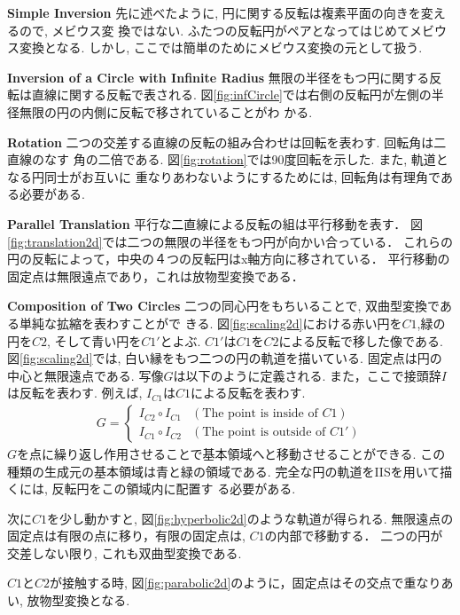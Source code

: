 \noindent\textbf{Simple Inversion}
先に述べたように, 円に関する反転は複素平面の向きを変えるので, メビウス変
換ではない.
ふたつの反転円がペアとなってはじめてメビウス変換となる.
しかし, ここでは簡単のためにメビウス変換の元として扱う.

\noindent\textbf{Inversion of a Circle with Infinite Radius}
無限の半径をもつ円に関する反転は直線に関する反転で表される.
図\ref{fig:infCircle}では右側の反転円が左側の半径無限の円の内側に反転で移されていることがわ
かる.

\noindent\textbf{Rotation}
二つの交差する直線の反転の組み合わせは回転を表わす. 回転角は二直線のなす
角の二倍である. 図\ref{fig:rotation}では90度回転を示した. また, 軌道となる円同士がお互いに
重なりあわないようにするためには, 回転角は有理角である必要がある.

\noindent\textbf{Parallel Translation}
平行な二直線による反転の組は平行移動を表す．
図\ref{fig:translation2d}では二つの無限の半径をもつ円が向かい合っている．
これらの円の反転によって，中央の４つの反転円はx軸方向に移されている．
平行移動の固定点は無限遠点であり，これは放物型変換である．

\noindent\textbf{Composition of Two Circles}
二つの同心円をもちいることで, 双曲型変換である単純な拡縮を表わすことがで
きる.
図\ref{fig:scaling2d}における赤い円を$C1$,緑の円を$C2$, そして青い円を$C1'$とよぶ.
$C1'$は$C1$を$C2$による反転で移した像である.
図\ref{fig:scaling2d}では, 白い縁をもつ二つの円の軌道を描いている.
固定点は円の中心と無限遠点である.
写像$G$は以下のように定義される.
また，ここで接頭辞$I$は反転を表わす.
例えば, $I_{C1}$は$C1$による反転を表わす.
\begin{align*}
 G =
  \begin{cases}
   I_{C2} \circ I_{C1} & (\text{The point is inside of } C1) \\
   I_{C1} \circ I_{C2} & (\text{The point is outside of } C1')
  \end{cases}
\end{align*}
$G$を点に繰り返し作用させることで基本領域へと移動させることができる.
この種類の生成元の基本領域は青と緑の領域である.
完全な円の軌道をIISを用いて描くには, 反転円をこの領域内に配置す
る必要がある.

次に$C1$を少し動かすと, 図\ref{fig:hyperbolic2d}のような軌道が得られる.
無限遠点の固定点は有限の点に移り，有限の固定点は, $C1$の内部で移動する．
二つの円が交差しない限り, これも双曲型変換である.

$C1$と$C2$が接触する時, 図\ref{fig:parabolic2d}のように，固定点はその交点で重なりあい, 放物型変換となる.

